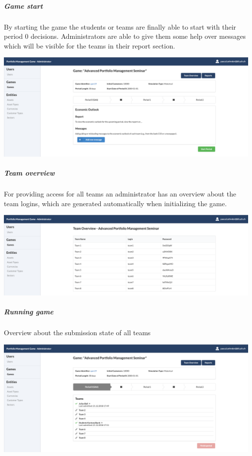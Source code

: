 \subparagraph{Game start}
By starting the game the students or teams are finally able to start with their period 0 decisions. Administrators are able to give them some help over messages which will be visible for the teams in their report section.
\begin{center}
  \includegraphics[scale=0.2]{img/application-overview/administrator/game_start.png}
\end{center}

\subparagraph{Team overview}
For providing access for all teams an administrator has an overview about the team logins, which are generated automatically when initializing the game.
\begin{center}
  \includegraphics[scale=0.2]{img/application-overview/administrator/team_login_overview.png}
\end{center}

\subparagraph{Running game}
Overview about the submission state of all teams
\begin{center}
  \includegraphics[scale=0.2]{img/application-overview/administrator/running_game.png}
\end{center}





